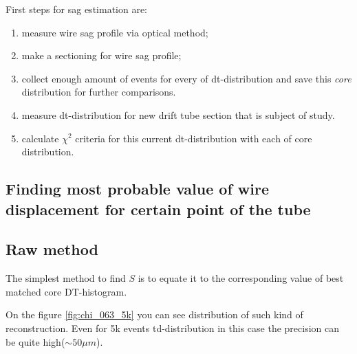 \documentclass[]{article}
\begin{document}
	First steps for sag estimation are:
	\begin{enumerate}
	\item measure wire sag profile via optical method;	
	\item make a sectioning for wire sag profile;
	\item collect enough amount of events for every of dt-distribution and save this {\it core} distribution for further comparisons.
	\item measure dt-distribution for new drift tube section that is subject of study.
	\item calculate $\chi^2$ criteria for this current dt-distribution with each of core distribution. 
	\end{enumerate}
	

	\subsection{Finding most probable value of wire displacement for certain point of the tube}
	
	\subsection{Raw method}
	The simplest method to find $S$ is to equate it to the corresponding value of best matched core DT-histogram.
	
	On the figure \ref{fig:chi_063_5k}  you can see distribution of such kind of reconstruction. Even for 5k events td-distribution in this case the precision can be quite high($\sim 50 \mu m$).
	
\end{document}
